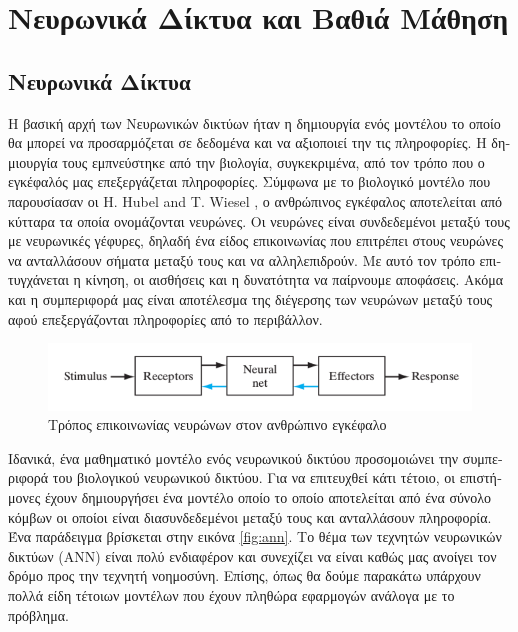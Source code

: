 \chapter{\textgreek{Νευρωνικά Δίκτυα και Βαθιά Μάθηση}}

\pagestyle{fancy}
\fancyhf{}
\renewcommand{\footrulewidth}{0.5pt}
\cfoot{\thepage}

\section{\textgreek{Νευρωνικά Δίκτυα}}
\textgreek{Η βασική αρχή των Νευρωνικών δικτύων ήταν η δημιουργία ενός μοντέλου το οποίο θα μπορεί να προσαρμόζεται σε δεδομένα και να αξιοποιεί την τις πληροφορίες. Η δημιουργία τους εμπνεύστηκε από την βιολογία, συγκεκριμένα, από τον τρόπο που ο εγκέφαλός μας επεξεργάζεται πληροφορίες. Σύμφωνα με το βιολογικό μοντέλο που παρουσίασαν οι} H. Hubel and T. Wiesel \cite{brain}, \textgreek{ο ανθρώπινος εγκέφαλος αποτελείται από κύτταρα τα οποία ονομάζονται νευρώνες. Οι νευρώνες είναι συνδεδεμένοι μεταξύ τους με νευρωνικές γέφυρες, δηλαδή ένα είδος επικοινωνίας που επιτρέπει στους νευρώνες να ανταλλάσουν σήματα μεταξύ τους και να αλληλεπιδρούν. Με αυτό τον τρόπο επιτυγχάνεται η κίνηση, οι αισθήσεις και η δυνατότητα να παίρνουμε αποφάσεις. Ακόμα και η συμπεριφορά μας είναι αποτέλεσμα της διέγερσης των νευρώνων μεταξύ τους αφού επεξεργάζονται πληροφορίες από το περιβάλλον.}

\begin{figure}[h]
 \centering
 \includegraphics[width=\textwidth, scale=0.5]{Images/Ann}

 \caption[Brain Stimulus]{\textgreek{Τρόπος επικοινωνίας νευρώνων στον ανθρώπινο εγκέφαλο} \cite{brain_neuron}}
 \label{fig:stimulus}
\end{figure}

\textgreek{Ιδανικά, ένα μαθηματικό μοντέλο ενός νευρωνικού δικτύου προσομοιώνει την συμπεριφορά του βιολογικού νευρωνικού δικτύου. Για να επιτευχθεί κάτι τέτοιο, οι επιστήμονες έχουν δημιουργήσει ένα μοντέλο οποίο το οποίο αποτελείται από ένα σύνολο κόμβων οι οποίοι είναι διασυνδεδεμένοι μεταξύ τους και ανταλλάσουν πληροφορία. Ένα παράδειγμα βρίσκεται στην εικόνα }\ref{fig:ann}. \textgreek{Το θέμα των τεχνητών νευρωνικών δικτύων} (ANN) \textgreek{είναι πολύ ενδιαφέρον και συνεχίζει να είναι καθώς μας ανοίγει τον δρόμο προς την τεχνητή νοημοσύνη. Επίσης, όπως θα δούμε παρακάτω υπάρχουν πολλά είδη τέτοιων μοντέλων που έχουν πληθώρα εφαρμογών ανάλογα με το πρόβλημα.}

